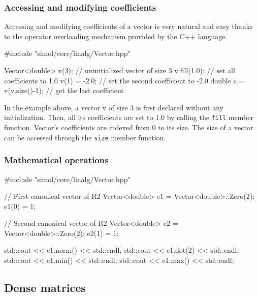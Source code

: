 \subsubsection{Accessing and modifying coefficients}

Accessing and modifying coefficients of a vector is very natural and easy thanks to the operator overloading mechanism provided by the C++ language. 
\begin{cppcode}
#include "simol/core/linalg/Vector.hpp"

Vector<double> v(3); // uninitialized vector of size 3
v.fill(1.0); // set all coefficients to 1.0
v(1) = -2.0; // set the second coefficient to -2.0
double c = v(v.size()-1); // get the last coefficient 
\end{cppcode}
In the example above, a vector $\texttt{v}$ of size 3 is first declared without any initialization. Then, all its coefficients are set to 1.0 by calling the \texttt{fill} member function. Vector's coefficients are indexed from 0 to its size. The size of a vector can be accessed through the \texttt{size} member function. 


\subsubsection{Mathematical operations}


\begin{cppcode}
#include "simol/core/linalg/Vector.hpp"

// First canonical vector of R2
Vector<double> e1 = Vector<double>::Zero(2);
e1(0) = 1;

// Second canonical vector of R2
Vector<double> e2 = Vector<double>::Zero(2);
e2(1) = 1;

std::cout << e1.norm() << std::endl;
std::cout << e1.dot(2) << std::endl;
std::cout << e1.min() << std::endl;
std::cout << e1.max() << std::endl;

\end{cppcode}


\subsection{Dense matrices}

